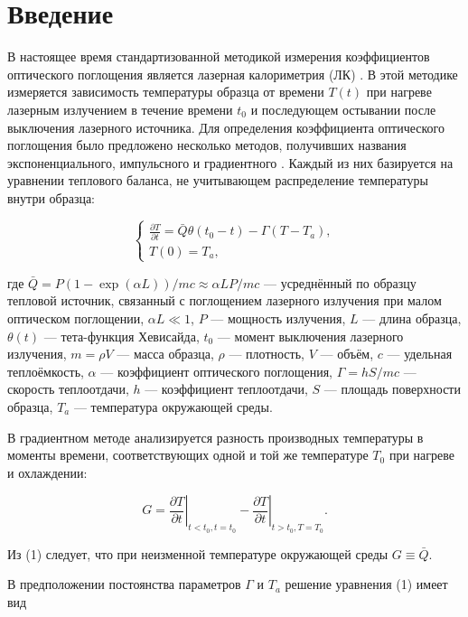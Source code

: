 \documentclass[a4paper,12pt]{article}
\begin{document}
	
\section{Введение}

В настоящее время стандартизованной методикой измерения коэффициентов оптического поглощения является лазерная калориметрия (ЛК) \cite{ISO11551}. В этой методике измеряется зависимость температуры образца от времени $T(t)$ при нагреве лазерным излучением в течение времени $t_0$ и последующем остывании после выключения лазерного источника. Для определения коэффициента оптического поглощения было предложено несколько методов, получивших названия экспоненциального, импульсного и градиентного \cite{Willamowski1996}. Каждый из них базируется на уравнении теплового баланса, не учитывающем распределение температуры внутри образца:

\begin{equation}
	\begin{cases}
		\frac{\partial T}{\partial t} = \bar{Q}\theta(t_0 - t) - \Gamma(T - T_a), \\
		T(0) = T_a,
	\end{cases}
\end{equation}

где $\bar{Q} = P(1 - \exp(\alpha L))/mc \approx \alpha LP/mc$ --- усреднённый по образцу тепловой источник, связанный с поглощением лазерного излучения при малом оптическом поглощении, $\alpha L \ll 1$, $P$ --- мощность излучения, $L$ --- длина образца, $\theta(t)$ --- тета-функция Хевисайда, $t_0$ --- момент выключения лазерного излучения, $m = \rho V$ --- масса образца, $\rho$ --- плотность, $V$ --- объём, $c$ --- удельная теплоёмкость, $\alpha$ --- коэффициент оптического поглощения, $\Gamma = hS/mc$ --- скорость теплоотдачи, $h$ --- коэффициент теплоотдачи, $S$ --- площадь поверхности образца, $T_a$ --- температура окружающей среды.

В градиентном методе анализируется разность производных температуры в моменты времени, соответствующих одной и той же температуре $T_0$ при нагреве и охлаждении:

\begin{equation}
	G = \left.\frac{\partial T}{\partial t}\right|_{t<t_0, t=t_0} - \left.\frac{\partial T}{\partial t}\right|_{t>t_0, T=T_0}.
\end{equation}

Из (1) следует, что при неизменной температуре окружающей среды $G \equiv \bar{Q}$.

В предположении постоянства параметров $\Gamma$ и $T_a$ решение уравнения (1) имеет вид
\end{document}
